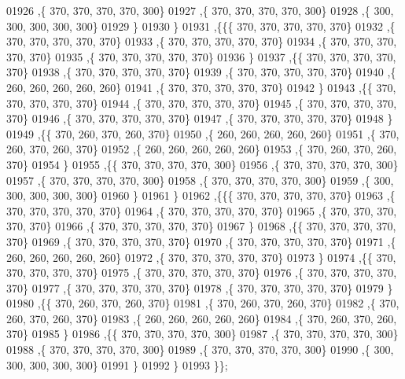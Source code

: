 \begin{DoxyCode}
01926    ,\{   370,   370,   370,   370,   300\}
01927    ,\{   370,   370,   370,   370,   300\}
01928    ,\{   300,   300,   300,   300,   300\}
01929    \}
01930   \}
01931  ,\{\{\{   370,   370,   370,   370,   370\}
01932    ,\{   370,   370,   370,   370,   370\}
01933    ,\{   370,   370,   370,   370,   370\}
01934    ,\{   370,   370,   370,   370,   370\}
01935    ,\{   370,   370,   370,   370,   370\}
01936    \}
01937   ,\{\{   370,   370,   370,   370,   370\}
01938    ,\{   370,   370,   370,   370,   370\}
01939    ,\{   370,   370,   370,   370,   370\}
01940    ,\{   260,   260,   260,   260,   260\}
01941    ,\{   370,   370,   370,   370,   370\}
01942    \}
01943   ,\{\{   370,   370,   370,   370,   370\}
01944    ,\{   370,   370,   370,   370,   370\}
01945    ,\{   370,   370,   370,   370,   370\}
01946    ,\{   370,   370,   370,   370,   370\}
01947    ,\{   370,   370,   370,   370,   370\}
01948    \}
01949   ,\{\{   370,   260,   370,   260,   370\}
01950    ,\{   260,   260,   260,   260,   260\}
01951    ,\{   370,   260,   370,   260,   370\}
01952    ,\{   260,   260,   260,   260,   260\}
01953    ,\{   370,   260,   370,   260,   370\}
01954    \}
01955   ,\{\{   370,   370,   370,   370,   300\}
01956    ,\{   370,   370,   370,   370,   300\}
01957    ,\{   370,   370,   370,   370,   300\}
01958    ,\{   370,   370,   370,   370,   300\}
01959    ,\{   300,   300,   300,   300,   300\}
01960    \}
01961   \}
01962  ,\{\{\{   370,   370,   370,   370,   370\}
01963    ,\{   370,   370,   370,   370,   370\}
01964    ,\{   370,   370,   370,   370,   370\}
01965    ,\{   370,   370,   370,   370,   370\}
01966    ,\{   370,   370,   370,   370,   370\}
01967    \}
01968   ,\{\{   370,   370,   370,   370,   370\}
01969    ,\{   370,   370,   370,   370,   370\}
01970    ,\{   370,   370,   370,   370,   370\}
01971    ,\{   260,   260,   260,   260,   260\}
01972    ,\{   370,   370,   370,   370,   370\}
01973    \}
01974   ,\{\{   370,   370,   370,   370,   370\}
01975    ,\{   370,   370,   370,   370,   370\}
01976    ,\{   370,   370,   370,   370,   370\}
01977    ,\{   370,   370,   370,   370,   370\}
01978    ,\{   370,   370,   370,   370,   370\}
01979    \}
01980   ,\{\{   370,   260,   370,   260,   370\}
01981    ,\{   370,   260,   370,   260,   370\}
01982    ,\{   370,   260,   370,   260,   370\}
01983    ,\{   260,   260,   260,   260,   260\}
01984    ,\{   370,   260,   370,   260,   370\}
01985    \}
01986   ,\{\{   370,   370,   370,   370,   300\}
01987    ,\{   370,   370,   370,   370,   300\}
01988    ,\{   370,   370,   370,   370,   300\}
01989    ,\{   370,   370,   370,   370,   300\}
01990    ,\{   300,   300,   300,   300,   300\}
01991    \}
01992   \}
01993  \}\};
\end{DoxyCode}
